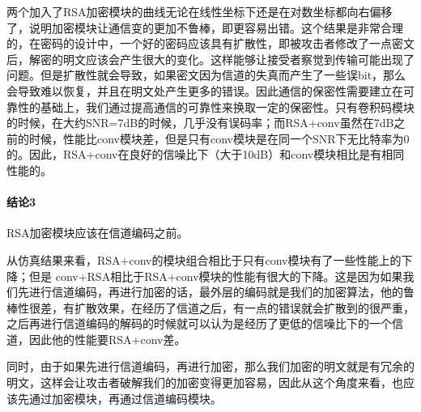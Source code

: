 两个加入了RSA加密模块的曲线无论在线性坐标下还是在对数坐标都向右偏移了，说明加密模块让通信变的更加不鲁棒，即更容易出错。这个结果是非常合理的，在密码的设计中，一个好的密码应该具有扩散性，即被攻击者修改了一点密文后，解密的明文应该会产生很大的变化。这样能够让接受者察觉到传输可能出现了问题。但是扩散性就会导致，如果密文因为信道的失真而产生了一些误bit，那么会导致难以恢复，并且在明文处产生更多的错误。因此通信的保密性需要建立在可靠性的基础上，我们通过提高通信的可靠性来换取一定的保密性。只有卷积码模块的时候，在大约SNR=7dB的时候，几乎没有误码率；而RSA+conv虽然在7dB之前的时候，性能比conv模块差，但是只有conv模块是在同一个SNR下无比特率为0的。因此，RSA+conv在良好的信噪比下（大于10dB）和conv模块相比是有相同性能的。

\paragraph{结论3}RSA加密模块应该在信道编码之前。

从仿真结果来看，RSA+conv的模块组合相比于只有conv模块有了一些性能上的下降；但是 conv+RSA相比于RSA+conv模块的性能有很大的下降。这是因为如果我们先进行信道编码，再进行加密的话，最外层的编码就是我们的加密算法，他的鲁棒性很差，有扩散效果，在经历了信道之后，有一点的错误就会扩散到的很严重，之后再进行信道编码的解码的时候就可以认为是经历了更低的信噪比下的一个信道，因此他的性能要RSA+conv差。

同时，由于如果先进行信道编码，再进行加密，那么我们加密的明文就是有冗余的明文，这样会让攻击者破解我们的加密变得更加容易，因此从这个角度来看，也应该先通过加密模块，再通过信道编码模块。

